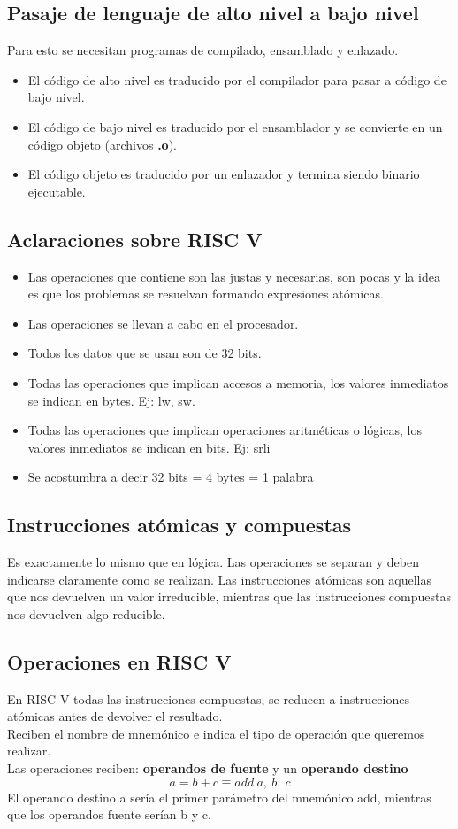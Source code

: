 \documentclass[10pt,a4paper]{article}
\begin{document}
\subsection*{Pasaje de lenguaje de alto nivel a bajo nivel}
Para esto se necesitan programas de compilado, ensamblado y enlazado.
\begin{itemize}
    \item El código de alto nivel es traducido por el compilador para pasar a código de bajo nivel.
    \item El código de bajo nivel es traducido por el ensamblador y se convierte en un código objeto (archivos \textbf{.o}).
    \item El código objeto es traducido por un enlazador y termina siendo binario ejecutable.
\end{itemize}
\subsection*{Aclaraciones sobre RISC V}
\begin{itemize}
    \item Las operaciones que contiene son las justas y necesarias, son pocas y la idea es que los problemas se resuelvan formando expresiones atómicas. 
    \item Las operaciones se llevan a cabo en el procesador.
    \item Todos los datos que se usan son de 32 bits.
    \item Todas las operaciones que implican accesos a memoria, los valores inmediatos se indican en bytes. Ej: lw, sw.
    \item Todas las operaciones que implican operaciones aritméticas o lógicas, los valores inmediatos se indican en bits. Ej: srli
    \item Se acostumbra a decir 32 bits = 4 bytes = 1 palabra
\end{itemize}
\subsection*{Instrucciones atómicas y compuestas}
Es exactamente lo mismo que en lógica. Las operaciones se separan y deben indicarse claramente como se realizan.
Las instrucciones atómicas son aquellas que nos devuelven un valor irreducible, mientras que las instrucciones compuestas nos devuelven algo reducible. 
\subsection*{Operaciones en RISC V}
En RISC-V todas las instrucciones compuestas, se reducen a instrucciones atómicas antes de devolver el resultado. \\
Reciben el nombre de mnemónico e indica el tipo de operación que queremos realizar. \\
Las operaciones reciben: \textbf{operandos de fuente} y un \textbf{operando destino}
\[a = b + c \equiv add \ a,\ b,\ c\]
El operando destino a sería el primer parámetro del mnemónico add, mientras que los operandos fuente serían b y c.
\end{document}
